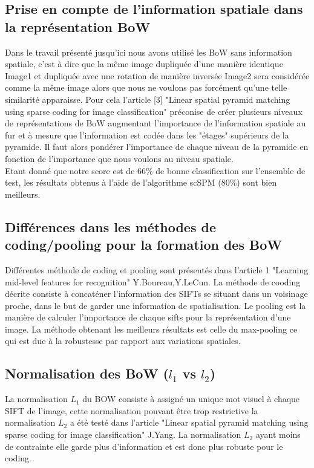 \documentclass[a4paper]{article}
\begin{document}
\subsection{Prise en compte de l'information spatiale dans la représentation BoW}
Dans le travail présenté jusqu'ici nous avons utilisé les BoW sans information spatiale, c'est à dire que la même image dupliquée d'une manière identique Image1 et dupliquée avec une rotation de manière inversée Image2 sera considérée comme la même image alors que nous ne voulons pas forcément qu'une telle similarité apparaisse. Pour cela l'article [3] "Linear spatial pyramid matching using sparse coding for image classification" préconise de créer plusieurs niveaux de représentations de BoW augmentant l'importance de l'information spatiale au fur et à mesure que l'information est codée dans les "étages" supérieurs de la pyramide. Il faut alors pondérer l'importance de chaque niveau de la pyramide en fonction de l'importance que nous voulons au niveau spatiale.\\
Etant donné que notre score est de 66\% de bonne classification sur l'ensemble de test, les résultats obtenus à l'aide de l'algorithme scSPM (80\%) sont bien meilleurs.
\subsection{Différences dans les méthodes de coding/pooling pour la formation des BoW}
Différentes méthode de coding et pooling sont présentés dans l'article 1 "Learning mid-level features for recognition" Y.Boureau,Y.LeCun. La méthode de cooding décrite consiste à concaténer l'information des SIFTs se situant dans un voisinage proche, dans le but de garder une information de spatialisation. Le pooling est la manière de calculer l'importance de chaque sifts pour la représentation d'une image. La méthode obtenant les meilleurs résultats est celle du max-pooling ce qui est due à la robustesse par rapport aux variations spatiales.


\subsection{Normalisation des BoW ($l_1$ vs  $l_2$)}
La normalisation $L_1$ du BOW consiste à assigné un unique mot visuel à chaque SIFT de l'image, cette normalisation pouvant être trop restrictive la normalisation $L_2$ a été testé dans l'article "Linear spatial pyramid matching using sparse coding for image classification" J.Yang. La normalisation $L_2$ ayant moins de contrainte elle garde plus d'information et est donc plus robuste pour le coding.
\end{document}
